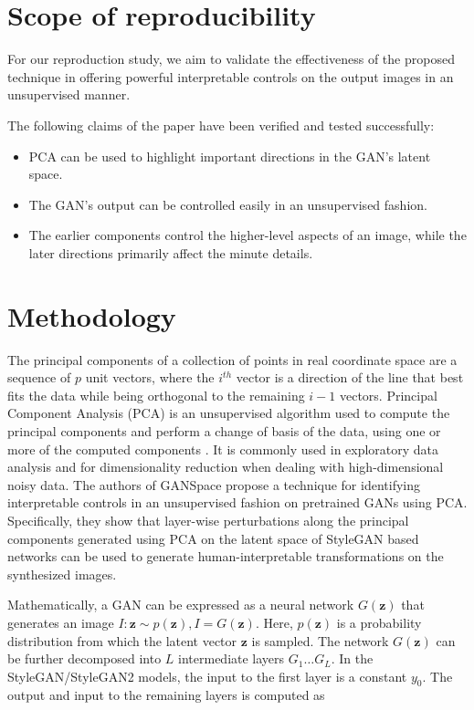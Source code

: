 \section{Scope of reproducibility}
\label{claims}


For our reproduction study, we aim to validate the effectiveness of the proposed technique in offering powerful interpretable controls on the output images in an unsupervised manner.

The following claims of the paper have been verified and tested successfully:
\begin{itemize}[noitemsep]
    \item PCA can be used to highlight important directions in the GAN's latent space.
    \item The GAN's output can be controlled easily in an unsupervised fashion.
    \item The earlier components control the higher-level aspects of an image, while the later directions primarily affect the minute details.
\end{itemize}


\section{Methodology}

The principal components of a collection of points in real coordinate space are a sequence of $p$ unit vectors, where the $i^{th}$ vector is a direction of the line that best fits the data while being orthogonal to the remaining $i-1$ vectors. Principal Component Analysis (PCA) is an unsupervised algorithm used to compute the principal components and perform a change of basis of the data, using one or more of the computed components \cite{pca_wiki}. It is commonly used in exploratory data analysis and for dimensionality reduction when dealing with high-dimensional noisy data. The authors of GANSpace propose a technique for identifying interpretable controls in an unsupervised fashion on pretrained GANs using PCA. Specifically, they show that layer-wise perturbations along the principal components generated using PCA on the latent space of StyleGAN based networks can be used to generate human-interpretable transformations on the synthesized images.

Mathematically, a GAN can be expressed as a neural network $G(\mathbf{z})$ that generates an image $I: \mathbf{z} \sim p(\mathbf{z}), I = G(\mathbf{z})$. Here, $p(\mathbf{z})$ is a probability distribution from which the latent vector $\mathbf{z}$ is sampled. The network $G(\mathbf{z})$ can be further decomposed into $L$ intermediate layers $G_1\ldots G_L$. In the StyleGAN/StyleGAN2 models, the input to the first layer is a constant $y_0$. The output and input to the remaining layers is computed as

